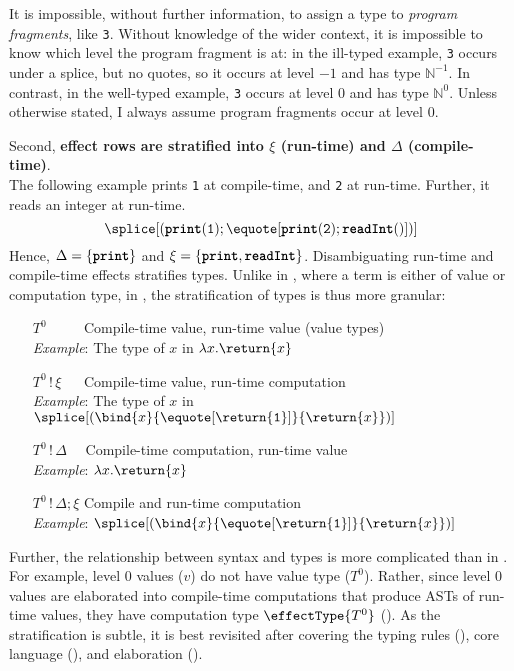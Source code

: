   It is impossible, without further information, to assign a type to \textit{program fragments}, like \texttt{3}. Without knowledge of the wider context, it is impossible to know which level the program fragment is at: in the ill-typed example, \texttt{3} occurs under a splice, but no quotes, so it occurs at level $-1$ and has type $\mathbb{N}^{-1}$. In contrast, in the well-typed example, \texttt{3} occurs at level $0$ and has type $\mathbb{N}^0$. Unless otherwise stated, I always assume program fragments occur at level $0$.

  Second, \textbf{effect rows are stratified into $\xi$ (run-time) and $\Delta$ (compile-time)}.\\
  The following example prints \texttt{1} at compile-time, and \texttt{2} at run-time. Further, it reads an integer at run-time.
\[\splice[{(\textbf{\texttt{print}}(\texttt{1}); \equote[\textbf{\texttt{print}}(\texttt{2}); \textbf{\texttt{readInt}}()])}]\]
Hence, $\Delta = \{ \textbf{\texttt{print}} \}$ and $\xi = \{ \textbf{\texttt{print}}, \textbf{\texttt{readInt}} \}$. Disambiguating run-time and compile-time effects stratifies types. Unlike in \efflang{}, where a term is either of value or computation type, in \sourceLang{}, the stratification of types is thus more granular:
\begin{enumerate}[leftmargin=5.8\parindent]
  \item[$T^0 \quad\quad\,\,$] Compile-time value, run-time value (value types) \\
  \textit{Example}: The type of $x$ in $\lambda x. \return{x}$
  \item[$T^0 \, ! \, \xi \quad\;$] Compile-time value, run-time computation  \\
  \textit{Example}: The type of $x$ in $\splice[(\bind{x}{\equote[\return{\texttt{1}}]}{\return{x}})]$
  \item[$T^0 \, ! \, \Delta \quad$] Compile-time computation, run-time value \\
  \textit{Example}: $\lambda x. \return{x}$ 
  \item[$T^0 \, ! \, \Delta; \xi$] Compile and run-time computation \\
  \textit{Example}: $\splice[(\bind{x}{\equote[\return{\texttt{1}}]}{\return{x}})]$
\end{enumerate}
Further, the relationship between syntax and types is more complicated than in \efflang{}. For example, level $0$ \sourceLang{} values ($v$) do not have value type ($T^0$). Rather, since level $0$ values are elaborated into compile-time computations  that produce ASTs of run-time values, they have computation type $\effectType{T^{0}}$ (). As the stratification is subtle, it is best revisited after covering the typing rules (), core language (), and elaboration ().

